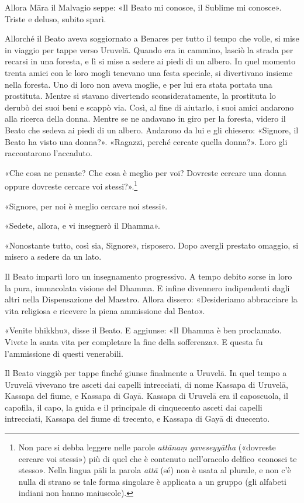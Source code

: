 Allora Māra il Malvagio seppe: «Il Beato mi conosce, il Sublime mi conosce».
Triste e deluso, subito sparì.

Allorché il Beato aveva soggiornato a Benares per tutto il tempo che volle, si
mise in viaggio per tappe verso Uruvelā. Quando era in cammino, lasciò la strada
per recarsi in una foresta, e lì si mise a sedere ai piedi di un albero. In quel
momento trenta amici con le loro mogli tenevano una festa speciale, si
divertivano insieme nella foresta. Uno di loro non aveva moglie, e per lui era
stata portata una prostituta. Mentre si stavano divertendo sconsideratamente, la
prostituta lo derubò dei suoi beni e scappò via. Così, al fine di aiutarlo, i
suoi amici andarono alla ricerca della donna. Mentre se ne andavano in giro per
la foresta, videro il Beato che sedeva ai piedi di un albero. Andarono da lui e
gli chiesero: «Signore, il Beato ha visto una donna?». «Ragazzi, perché cercate
quella donna?». Loro gli raccontarono l’accaduto.

«Che cosa ne pensate? Che cosa è meglio per voi? Dovreste cercare una donna
oppure dovreste cercare voi stessi?».\footnote{Non pare si debba leggere nelle
  parole \emph{attānaṃ gaveseyyātha} («dovreste cercare voi stessi») più di quel
  che è contenuto nell’oracolo delfico «conosci te stesso». Nella lingua pāli la
  parola \emph{attā} (sé) non è usata al plurale, e non c’è nulla di strano se
  tale forma singolare è applicata a un gruppo (gli alfabeti indiani non hanno
  maiuscole).}

«Signore, per noi è meglio cercare noi stessi».

«Sedete, allora, e vi insegnerò il Dhamma».

«Nonostante tutto, così sia, Signore», risposero. Dopo avergli prestato omaggio,
si misero a sedere da un lato.

Il Beato impartì loro un insegnamento progressivo. A tempo debito sorse in loro
la pura, immacolata visione del Dhamma. E infine divennero indipendenti dagli
altri nella Dispensazione del Maestro. Allora dissero: «Desideriamo abbracciare
la vita religiosa e ricevere la piena ammissione dal Beato».

«Venite bhikkhu», disse il Beato. E aggiunse: «Il Dhamma è ben proclamato.
Vivete la santa vita per completare la fine della sofferenza». E questa fu
l’ammissione di questi venerabili.

Il Beato viaggiò per tappe finché giunse finalmente a Uruvelā. In quel tempo a
Uruvelā vivevano tre asceti dai capelli intrecciati, di nome Kassapa di Uruvelā,
Kassapa del fiume, e Kassapa di Gayā. Kassapa di Uruvelā era il caposcuola, il
capofila, il capo, la guida e il principale di cinquecento asceti dai capelli
intrecciati, Kassapa del fiume di trecento, e Kassapa di Gayā di duecento.

